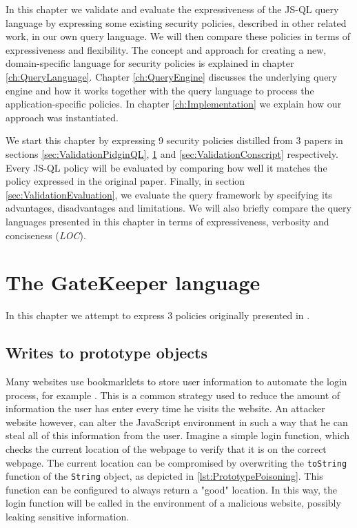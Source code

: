In this chapter we validate and evaluate the expressiveness of the JS-QL query language by expressing some existing security policies, described in other related work, in our own query language. We will then compare these policies in terms of expressiveness and flexibility. %
The concept and approach for creating a new, domain-specific language for security policies is explained in chapter \ref{ch:QueryLanguage}. Chapter \ref{ch:QueryEngine} discusses the underlying query engine and how it works together with the query language to process the application-specific policies. In chapter \ref{ch:Implementation} we explain how our approach was instantiated.

We start this chapter by expressing 9 security policies distilled from 3 papers in sections \ref{sec:ValidationPidginQL}, \ref{sec:ValidationGK} and \ref{sec:ValidationConscript} respectively. Every JS-QL policy will be evaluated by comparing how well it matches the policy expressed in the original paper. Finally, in section \ref{sec:ValidationEvaluation}, we evaluate the query framework by specifying its advantages, disadvantages and limitations. We will also briefly compare the query languages presented in this chapter in terms of expressiveness, verbosity and conciseness (\textit{LOC}).
\section{The GateKeeper language}
\label{sec:ValidationGK}

In this chapter we attempt to express 3 policies originally presented in \cite{GateKeeper}.

\subsection{Writes to prototype objects}

Many websites use bookmarklets to store user information to automate the login process, for example \cite{PrototypePoisoning}. This is a common strategy used to reduce the amount of information the user has enter every time he visits the website. An attacker website however, can alter the JavaScript environment in such a way that he can steal all of this information from the user. Imagine a simple login function, which checks the current location of the webpage to verify that it is on the correct webpage. The current location can be compromised by overwriting the \texttt{toString} function of the \texttt{String} object, as depicted in \ref{lst:PrototypePoisoning}. This function can be configured to always return a "good" location. In this way, the login function will be called in the environment of a malicious website, possibly leaking sensitive information.

